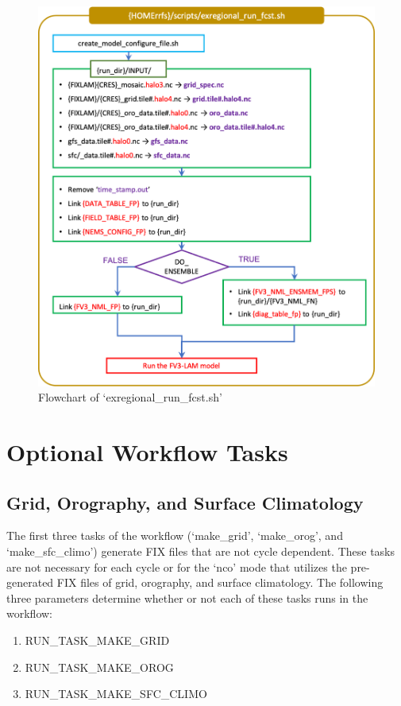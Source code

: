 \documentclass[11pt,fleqn]{report}              %
\begin{document}
\begin{figure}[ht!]
  \centering
  \includegraphics[width=0.7\linewidth]{FV3LAM_wflow_run_fcst.png}
  \caption{Flowchart of `exregional\_run\_fcst.sh'}
  \label{fig:workflow_run_fcst}
\end{figure}




\section{Optional Workflow Tasks}
\label{sec:wflow_select}

\subsection{Grid, Orography, and Surface Climatology}
\label{subsec:turn_cycle_independent}

The first three tasks of the workflow (`make\_grid', `make\_orog', and `make\_sfc\_climo') generate FIX files that are not cycle dependent. These tasks are not necessary for each cycle or for the `nco' mode that utilizes the pre-generated FIX files of grid, orography, and surface climatology. The following three parameters determine whether or not each of these tasks runs in the workflow:
\begin{enumerate}
\item RUN\_TASK\_MAKE\_GRID
\item RUN\_TASK\_MAKE\_OROG
\item RUN\_TASK\_MAKE\_SFC\_CLIMO
\end{enumerate}
\end{document}

